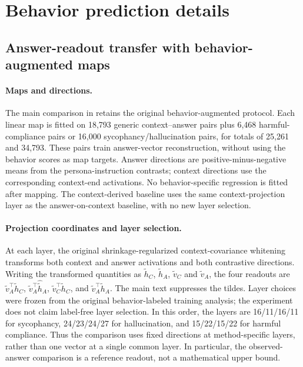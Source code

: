 \section{Behavior prediction details}
\label{app:behavior}


\subsection{Answer-readout transfer with behavior-augmented maps}
\label{app:behavior-original}

\paragraph{Maps and directions.} The main comparison in  retains the original behavior-augmented protocol. Each linear map is fitted on 18,793 generic context--answer pairs plus 6,468 harmful-compliance pairs or 16,000 sycophancy/hallucination pairs, for totals of 25,261 and 34,793. These pairs train answer-vector reconstruction, without using the behavior scores as map targets. Answer directions are positive-minus-negative means from the persona-instruction contrasts; context directions use the corresponding context-end activations. No behavior-specific regression is fitted after mapping. The context-derived baseline uses the same context-projection layer as the answer-on-context baseline, with no new layer selection.

\paragraph{Projection coordinates and layer selection.} At each layer, the original shrinkage-regularized context-covariance whitening transforms both context and answer activations and both contrastive directions. Writing the transformed quantities as $\tilde h_C$, $\tilde h_A$, $\tilde v_C$ and $\tilde v_A$, the four readouts are $\tilde v_A^\top\tilde h_C$, $\tilde v_A^\top\widehat{\tilde h}_A$, $\tilde v_C^\top\tilde h_C$, and $\tilde v_A^\top\tilde h_A$. The main text suppresses the tildes. Layer choices were frozen from the original behavior-labeled training analysis; the experiment does not claim label-free layer selection. In this order, the layers are 16/11/16/11 for sycophancy, 24/23/24/27 for hallucination, and 15/22/15/22 for harmful compliance. Thus the comparison uses fixed directions at method-specific layers, rather than one vector at a single common layer. In particular, the observed-answer comparison is a reference readout, not a mathematical upper bound.

